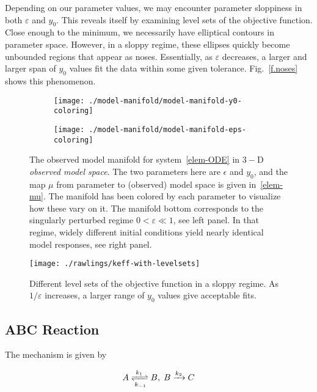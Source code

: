 \documentclass[11pt]{article}
\newcommand{\eps}{\varepsilon}
\begin{document}
Depending on our parameter values, we may encounter parameter
sloppiness in both $\eps$ and $y_0$. This reveals itself by examining
level sets of the objective function. Close enough to the minimum, we
necessarily have elliptical contours in parameter space. However, in a
sloppy regime, these ellipses quickly become unbounded regions that
appear as noses. Essentially, as $\eps$ decreases, a larger and larger
span of $y_0$ values fit the data within some given
tolerance. Fig.~\ref{f.noses} shows this phenomenon.

\begin{figure}[ht!]
  \begin{subfigure}[t]{0.49\textwidth}
    \centering
    \texttt{[image: ./model-manifold/model-manifold-y0-coloring]}
  \end{subfigure}
  \begin{subfigure}[t]{0.49\textwidth}
    \centering
    \texttt{[image: ./model-manifold/model-manifold-eps-coloring]}
  \end{subfigure} %
  \caption{The observed model manifold for
    system~\eqref{elem-ODE} in $3-$D \emph{observed model space}. The
    two parameters here are $\epsilon$ and $y_0$, and the map $\mu$
    from parameter to (observed) model space is given
    in~\eqref{elem-mu}. The manifold has been colored by each
    parameter to visualize how these vary on it. The manifold bottom
    corresponds to the singularly perturbed regime $0 < \eps \ll 1$,
    see left panel. In that regime, widely different initial
    conditions yield nearly identical model responses, see right
    panel. \label{f.elem.ex.1}}
\end{figure}

\begin{figure}[htbp]
  \centering
  \texttt{[image: ./rawlings/keff-with-levelsets]}
  \caption{Different level sets of the objective function in a sloppy
    regime. As $1/\eps$ increases, a larger range of $y_0$ values give
    acceptable fits.}
\end{figure}

\subsection{ABC Reaction}

The mechanism is given by

\begin{align*}
  A \xrightleftharpoons[k_{-1}]{k_1} B, \; B \xrightarrow[]{k_2} C
\end{align*}
\end{document}
